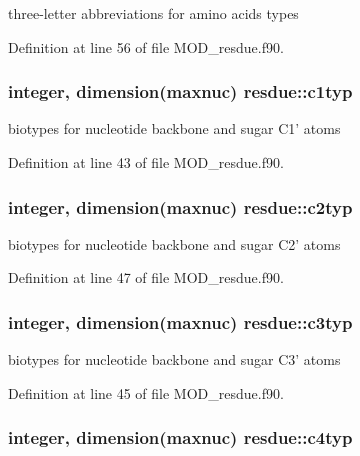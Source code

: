 three-\/letter abbreviations for amino acids types 



Definition at line 56 of file M\-O\-D\-\_\-resdue.\-f90.

\hypertarget{classresdue_a3c4a2a9aa6358a0182a34342206ee5ac}{
\subsubsection[{c1typ}]{\setlength{\rightskip}{0pt plus 5cm}integer, dimension(maxnuc) resdue\-::c1typ}}\label{classresdue_a3c4a2a9aa6358a0182a34342206ee5ac}


biotypes for nucleotide backbone and sugar C1' atoms 



Definition at line 43 of file M\-O\-D\-\_\-resdue.\-f90.

\hypertarget{classresdue_a65adf7bd2d2ac998e7765e55bad0890b}{
\subsubsection[{c2typ}]{\setlength{\rightskip}{0pt plus 5cm}integer, dimension(maxnuc) resdue\-::c2typ}}\label{classresdue_a65adf7bd2d2ac998e7765e55bad0890b}


biotypes for nucleotide backbone and sugar C2' atoms 



Definition at line 47 of file M\-O\-D\-\_\-resdue.\-f90.

\hypertarget{classresdue_a82523120c873c647aa84cbc82d9c49b4}{
\subsubsection[{c3typ}]{\setlength{\rightskip}{0pt plus 5cm}integer, dimension(maxnuc) resdue\-::c3typ}}\label{classresdue_a82523120c873c647aa84cbc82d9c49b4}


biotypes for nucleotide backbone and sugar C3' atoms 



Definition at line 45 of file M\-O\-D\-\_\-resdue.\-f90.

\hypertarget{classresdue_ac55d40734d1d1447f6563a917f496afc}{
\subsubsection[{c4typ}]{\setlength{\rightskip}{0pt plus 5cm}integer, dimension(maxnuc) resdue\-::c4typ}}\label{classresdue_ac55d40734d1d1447f6563a917f496afc}


